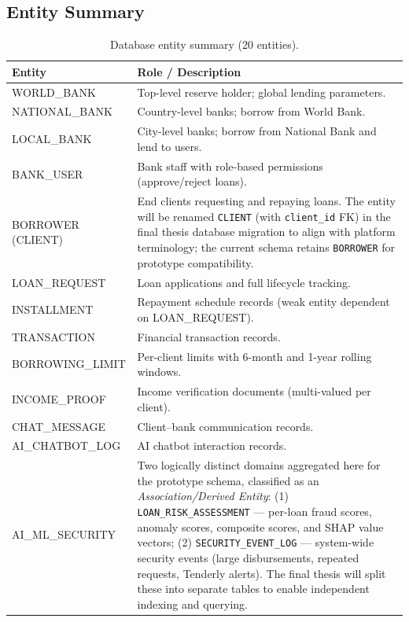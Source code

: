\documentclass[12pt,a4paper]{report}
\begin{document}
\subsection{Entity Summary}

\begin{table}[H]
\centering
\caption{Database entity summary (20 entities).}
\label{tab:db-entities}
\begin{tabular}{p{4cm}p{9.5cm}}
\hline
\textbf{Entity} & \textbf{Role / Description} \\
\hline
WORLD\_BANK & Top-level reserve holder; global lending parameters. \\
NATIONAL\_BANK & Country-level banks; borrow from World Bank. \\
LOCAL\_BANK & City-level banks; borrow from National Bank and lend to users. \\
BANK\_USER & Bank staff with role-based permissions (approve/reject loans). \\
BORROWER (CLIENT) & End clients requesting and repaying loans. The entity will be renamed \texttt{CLIENT} (with \texttt{client\_id} FK) in the final thesis database migration to align with platform terminology; the current schema retains \texttt{BORROWER} for prototype compatibility. \\
LOAN\_REQUEST & Loan applications and full lifecycle tracking. \\
INSTALLMENT & Repayment schedule records (weak entity dependent on LOAN\_REQUEST). \\
TRANSACTION & Financial transaction records. \\
BORROWING\_LIMIT & Per-client limits with 6-month and 1-year rolling windows. \\
INCOME\_PROOF & Income verification documents (multi-valued per client). \\
CHAT\_MESSAGE & Client--bank communication records. \\
AI\_CHATBOT\_LOG & AI chatbot interaction records. \\
AI\_ML\_SECURITY & Two logically distinct domains aggregated here for the prototype schema, classified as an \textit{Association/Derived Entity}: (1) \texttt{LOAN\_RISK\_ASSESSMENT} --- per-loan fraud scores, anomaly scores, composite scores, and SHAP value vectors; (2) \texttt{SECURITY\_EVENT\_LOG} --- system-wide security events (large disbursements, repeated requests, Tenderly alerts). The final thesis will split these into separate tables to enable independent indexing and querying. \\

\end{tabular}
\end{table}
\end{document}
